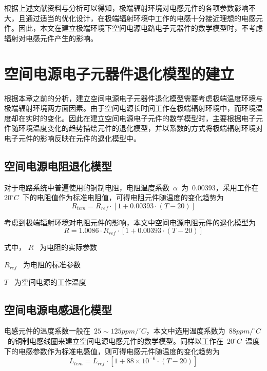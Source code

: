 根据上述文献资料与分析可以得知，极端辐射环境对电感元件的各项参数影响不大，且通过适当的优化设计，在极端辐射环境中工作的电感十分接近理想的电感元件。因此，本文在建立极端环境下空间电源电路电子元器件的数学模型时，不考虑辐射对电感元件产生的影响。
\section{空间电源电子元器件退化模型的建立}
\label{sec:chap2:mathematic-model}
根据本章之前的分析，建立空间电源电子元器件退化模型需要考虑极端温度环境与极端辐射环境两方面因素。由于空间电源长时间工作在极端辐射环境中，而环境温度却在实时的变化。因此在建立空间电源电子元件的数学模型时，主要根据电子元件随环境温度变化的趋势描绘元件的退化模型，并以系数的方式将极端辐射环境对电子元件的影响反映在元件的退化模型中。
\subsection{空间电源电阻退化模型}
对于电路系统中普遍使用的铜制电阻，电阻温度系数~$\alpha$~为~0.00393，采用工作在~$20^{\circ}C$~下的电阻值作为标准电阻值，可得电阻元件随温度的变化趋势为
\begin{equation}\label{equ:chap2:Index9}
  R_{tem}=R_{ref}\cdot \left[1+0.00393\cdot \left(T-20\right)\right]
\end{equation}

考虑到极端辐射环境对电阻元件的影响，本文中空间电源电阻元件的退化模型为
\begin{equation}\label{equ:chap2:Index10}
  R=1.0086\cdot R_{ref}\cdot \left[1+0.00393\cdot \left(T-20\right)\right]
\end{equation}

式中，  $R$ ~\quad  为电阻的实际参数

\hspace{1.3cm}$R_{ref}$ ~为电阻的标准参数

\hspace{1.3cm}$T$ \quad ~为空间电源的工作温度
\subsection{空间电源电感退化模型}
电感元件的温度系数一般在~$25\sim125ppm/^{\circ}C$，本文中选用温度系数为~$88ppm/^{\circ}C$~的铜制电感线圈来建立空间电源电感元件的数学模型。同样以工作在~$20^{\circ}C$~温度下的电感参数作为标准电感值，则可得电感元件随温度的变化趋势为
\begin{equation}\label{equ:chap2:Index11}
  L_{tem}=L_{ref}\cdot \left[1+88\times 10^{-6}\cdot \left(T-20\right)\right]
\end{equation}

